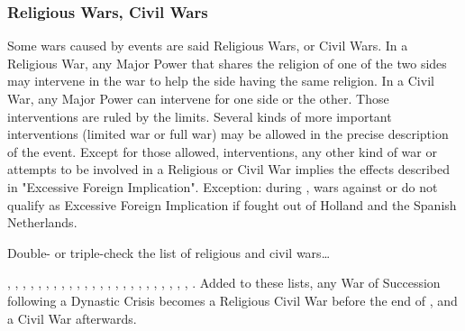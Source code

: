\subsubsection{Religious Wars, Civil Wars}\label{chDiplo:Religious Civil War}
\aparag Some wars caused by events are said Religious Wars, or Civil Wars. In
a Religious War, any Major Power that shares the religion of one of the two
sides may intervene in the war to help the side having the same religion. In a
Civil War, any Major Power can intervene for one side or the other.
\bparag Those interventions are ruled by the  limits.
\bparag Several kinds of more important interventions (limited war or full
war) may be allowed in the precise description of the event.  Except for those
allowed, interventions, any other kind of war or attempts to be involved in a
Religious or Civil War implies the effects described in "Excessive Foreign
Implication".
\bparag Exception: during , wars against \HIS or
\HOL do not qualify as Excessive Foreign Implication if fought out of Holland
and the Spanish Netherlands.
\begin{todo}
  Double- or triple-check the list of religious and civil wars\ldots
\end{todo}
, ,
, ,
,
, ,
, ,
, ,
, , , ,
, ,
, , , , ,
, ,
.
\bparag Added to these lists, any War of Succession following a Dynastic
Crisis becomes a Religious Civil War before the end of , and a Civil War afterwards.

